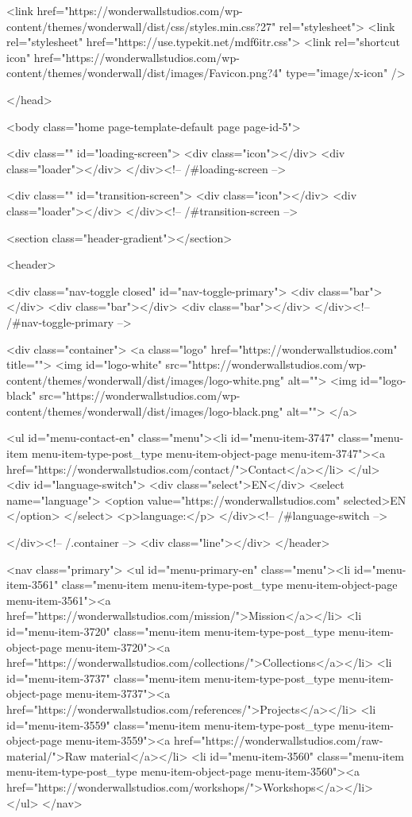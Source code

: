   <link href="https://wonderwallstudios.com/wp-content/themes/wonderwall/dist/css/styles.min.css?27" rel="stylesheet">
  <link rel="stylesheet" href="https://use.typekit.net/mdf6itr.css">
  <link rel="shortcut icon" href="https://wonderwallstudios.com/wp-content/themes/wonderwall/dist/images/Favicon.png?4" type="image/x-icon" />


</head>

<body class="home page-template-default page page-id-5">


  <div class="" id="loading-screen">
    <div class="icon"></div>
    <div class="loader"></div>
  </div><!-- /#loading-screen -->

  <div class="" id="transition-screen">
    <div class="icon"></div>
    <div class="loader"></div>
  </div><!-- /#transition-screen -->

  <section class="header-gradient"></section>

  <header>

    <div class="nav-toggle closed" id="nav-toggle-primary">
      <div class="bar"></div>
      <div class="bar"></div>
      <div class="bar"></div>
    </div><!-- /#nav-toggle-primary -->

    <div class="container">
      <a class="logo" href="https://wonderwallstudios.com" title="">
        <img id="logo-white" src="https://wonderwallstudios.com/wp-content/themes/wonderwall/dist/images/logo-white.png" alt="">
        <img id="logo-black" src="https://wonderwallstudios.com/wp-content/themes/wonderwall/dist/images/logo-black.png" alt="">
      </a>

      <ul id="menu-contact-en" class="menu"><li id="menu-item-3747" class="menu-item menu-item-type-post_type menu-item-object-page menu-item-3747"><a href="https://wonderwallstudios.com/contact/">Contact</a></li>
</ul>      <div id="language-switch">
        <div class="select">EN</div>        <select name="language">
          <option value="https://wonderwallstudios.com" selected>EN </option>        </select>
        <p>language:</p>
      </div><!-- /#language-switch -->

    </div><!-- /.container -->
    <div class="line"></div>
  </header>

  <nav class="primary">
    <ul id="menu-primary-en" class="menu"><li id="menu-item-3561" class="menu-item menu-item-type-post_type menu-item-object-page menu-item-3561"><a href="https://wonderwallstudios.com/mission/">Mission</a></li>
<li id="menu-item-3720" class="menu-item menu-item-type-post_type menu-item-object-page menu-item-3720"><a href="https://wonderwallstudios.com/collections/">Collections</a></li>
<li id="menu-item-3737" class="menu-item menu-item-type-post_type menu-item-object-page menu-item-3737"><a href="https://wonderwallstudios.com/references/">Projects</a></li>
<li id="menu-item-3559" class="menu-item menu-item-type-post_type menu-item-object-page menu-item-3559"><a href="https://wonderwallstudios.com/raw-material/">Raw material</a></li>
<li id="menu-item-3560" class="menu-item menu-item-type-post_type menu-item-object-page menu-item-3560"><a href="https://wonderwallstudios.com/workshops/">Workshops</a></li>
</ul>  </nav>

